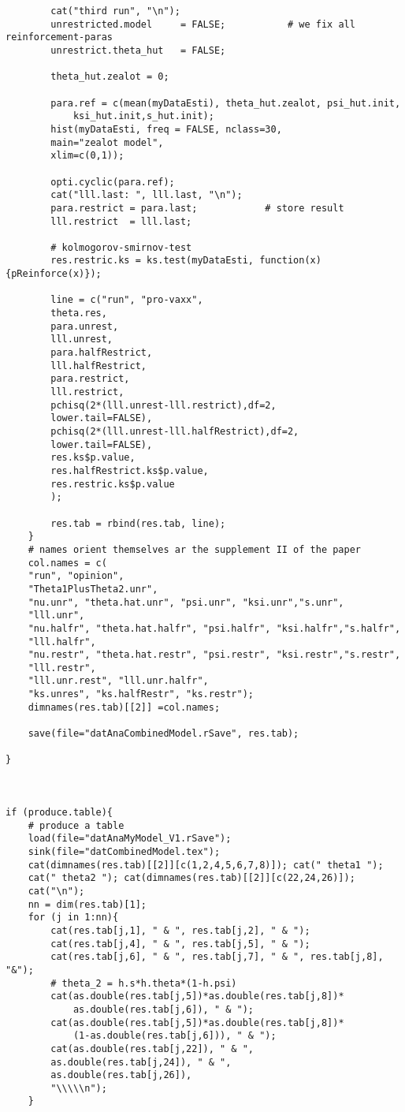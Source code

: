 \begin{lstlisting}
		cat("third run", "\n");
		unrestricted.model     = FALSE;           # we fix all reinforcement-paras
		unrestrict.theta_hut   = FALSE;
		
		theta_hut.zealot = 0;
		
		para.ref = c(mean(myDataEsti), theta_hut.zealot, psi_hut.init,
			ksi_hut.init,s_hut.init);
		hist(myDataEsti, freq = FALSE, nclass=30, 
		main="zealot model",
		xlim=c(0,1));
		
		opti.cyclic(para.ref);
		cat("lll.last: ", lll.last, "\n");
		para.restrict = para.last;            # store result
		lll.restrict  = lll.last;
		
		# kolmogorov-smirnov-test
		res.restric.ks = ks.test(myDataEsti, function(x){pReinforce(x)});
		
		line = c("run", "pro-vaxx", 
		theta.res,
		para.unrest,
		lll.unrest,
		para.halfRestrict,
		lll.halfRestrict,
		para.restrict,
		lll.restrict, 
		pchisq(2*(lll.unrest-lll.restrict),df=2, 
		lower.tail=FALSE), 
		pchisq(2*(lll.unrest-lll.halfRestrict),df=2, 
		lower.tail=FALSE), 
		res.ks$p.value,
		res.halfRestrict.ks$p.value,
		res.restric.ks$p.value
		);
		
		res.tab = rbind(res.tab, line);
	}
	# names orient themselves ar the supplement II of the paper
	col.names = c(
	"run", "opinion", 
	"Theta1PlusTheta2.unr",  
	"nu.unr", "theta.hat.unr", "psi.unr", "ksi.unr","s.unr",
	"lll.unr",
	"nu.halfr", "theta.hat.halfr", "psi.halfr", "ksi.halfr","s.halfr",
	"lll.halfr",
	"nu.restr", "theta.hat.restr", "psi.restr", "ksi.restr","s.restr",
	"lll.restr",
	"lll.unr.rest", "lll.unr.halfr",
	"ks.unres", "ks.halfRestr", "ks.restr");
	dimnames(res.tab)[[2]] =col.names;
	
	save(file="datAnaCombinedModel.rSave", res.tab);

}



if (produce.table){
	# produce a table
	load(file="datAnaMyModel_V1.rSave");
	sink(file="datCombinedModel.tex");
	cat(dimnames(res.tab)[[2]][c(1,2,4,5,6,7,8)]); cat(" theta1 ");
	cat(" theta2 "); cat(dimnames(res.tab)[[2]][c(22,24,26)]);
	cat("\n");
	nn = dim(res.tab)[1];
	for (j in 1:nn){
		cat(res.tab[j,1], " & ", res.tab[j,2], " & ");
		cat(res.tab[j,4], " & ", res.tab[j,5], " & ");
		cat(res.tab[j,6], " & ", res.tab[j,7], " & ", res.tab[j,8], "&");
		# theta_2 = h.s*h.theta*(1-h.psi)
		cat(as.double(res.tab[j,5])*as.double(res.tab[j,8])*
			as.double(res.tab[j,6]), " & ");
		cat(as.double(res.tab[j,5])*as.double(res.tab[j,8])*
			(1-as.double(res.tab[j,6])), " & ");
		cat(as.double(res.tab[j,22]), " & ", 
		as.double(res.tab[j,24]), " & ", 
		as.double(res.tab[j,26]), 
		"\\\\\n");
	}
	

\end{lstlisting}
